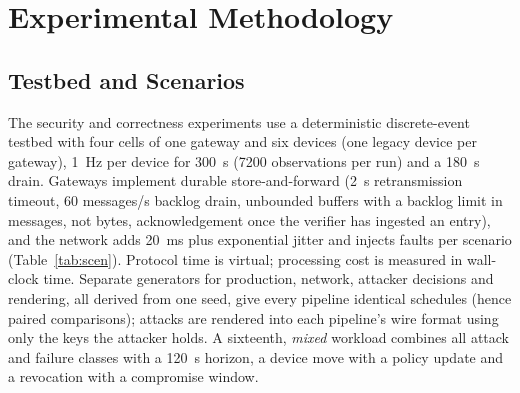 
\section{Experimental Methodology}\label{sec:methods}

\subsection{Testbed and Scenarios}\label{sec:testbed}

The security and correctness experiments use a deterministic discrete-event testbed with four cells of one gateway and six devices (one legacy device per gateway), 1~Hz per device for 300~s (7200 observations per run) and a 180~s drain. Gateways implement durable store-and-forward (2~s retransmission timeout, 60 messages/s backlog drain, unbounded buffers with a backlog limit in messages, not bytes, acknowledgement once the verifier has ingested an entry), and the network adds 20~ms plus exponential jitter and injects faults per scenario (Table~\ref{tab:scen}). Protocol time is virtual; processing cost is measured in wall-clock time. Separate generators for production, network, attacker decisions and rendering, all derived from one seed, give every pipeline identical schedules (hence paired comparisons); attacks are rendered into each pipeline's wire format using only the keys the attacker holds. A sixteenth, \emph{mixed} workload combines all attack and failure classes with a 120~s horizon, a device move with a policy update and a revocation with a compromise window.

